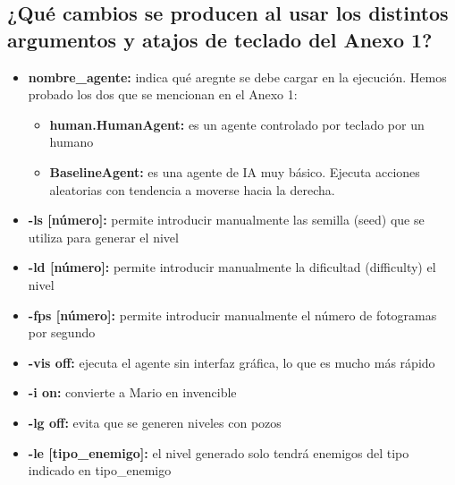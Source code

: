 \documentclass[10pt, spanish, pdftex]{../.memo/plantilla_memorias}
\begin{document}
\subsection{¿Qué cambios se producen al usar los distintos argumentos y atajos de teclado del Anexo 1?}
\begin{itemize}
    \item \textbf{nombre\_agente:} indica qué aregnte se debe cargar en la ejecución. Hemos probado los dos que se mencionan en el Anexo 1:
    \begin{itemize}
        \item \textbf{human.HumanAgent:} es un agente controlado por teclado por un humano
        \item \textbf{BaselineAgent:} es una agente de IA muy básico. Ejecuta acciones aleatorias con tendencia a moverse hacia la derecha.
    \end{itemize}
    \item \textbf{-ls [número]:} permite introducir manualmente las semilla (seed) que se utiliza para generar el nivel
    \item \textbf{-ld [número]:} permite introducir manualmente la dificultad (difficulty) el nivel
    \item \textbf{-fps [número]:} permite introducir manualmente el número de fotogramas por segundo
    \item \textbf{-vis off:} ejecuta el agente sin interfaz gráfica, lo que es mucho más rápido
    \item \textbf{-i on:} convierte a Mario en invencible
    \item \textbf{-lg off:} evita que se generen niveles con pozos
    \item \textbf{-le [tipo\_enemigo]:} el nivel generado solo tendrá enemigos del tipo indicado en tipo\_enemigo
\end{itemize}
\end{document}
